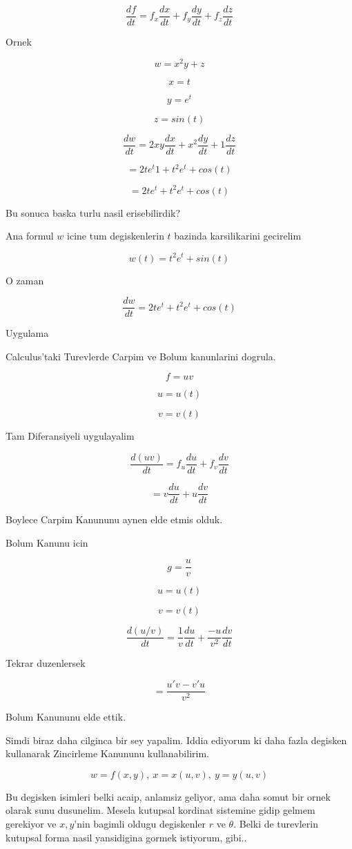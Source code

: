 \documentclass[12pt,fleqn]{article}
\begin{document}
\[ \frac{df}{dt} = f_x\frac{dx}{dt} + f_y\frac{dy}{dt} + f_z\frac{dz}{dt} \]

Ornek

\[ w = x^2y + z \]

\[ x = t \]

\[ y = e^t \]

\[ z = sin(t) \]

\[ \frac{dw}{dt} = 2xy \frac{dx}{dt} + x^2 \frac{dy}{dt} + 1 \frac{dz}{dt}\]

\[ = 2te^t 1 + t^2e^t+cos(t) \]

\[ = 2te^t + t^2e^t+cos(t) \]

Bu sonuca baska turlu nasil erisebilirdik? 

Ana formul $w$ icine tum degiskenlerin $t$ bazinda karsilikarini gecirelim

\[ w(t) = t^2e^t + sin(t) \]

O zaman

\[ \frac{dw}{dt} = 2te^t + t^2e^t + cos(t) \]

Uygulama

Calculus'taki Turevlerde Carpim ve Bolum kanunlarini dogrula. 

\[ f = uv \]

\[ u=u(t) \]

\[ v=v(t) \]

Tam Diferansiyeli uygulayalim

\[ \frac{d(uv)}{dt} = f_u\frac{du}{dt} + f_v \frac{dv}{dt}\]

\[  = v\frac{du}{dt} + u \frac{dv}{dt}\]

Boylece Carpim Kanununu aynen elde etmis olduk. 

Bolum Kanunu icin

\[ g = \frac{u}{v} \]

\[ u=u(t) \]

\[ v=v(t) \]

\[ \frac{d(u/v)}{dt} = \frac{1}{v} \frac{du}{dt} + \frac{-u}{v^2}\frac{dv}{dt}\]

Tekrar duzenlersek

\[ = \frac{u'v - v'u}{v^2} \]

Bolum Kanununu elde ettik.

Simdi biraz daha cilginca bir sey yapalim. Iddia ediyorum ki daha fazla
degisken kullanarak Zincirleme Kanununu kullanabilirim. 

\[ w = f(x,y), \ x = x(u,v), \ y = y(u,v) \]

Bu degisken isimleri belki acaip, anlamsiz geliyor, ama daha somut bir
ornek olarak sunu dusunelim. Mesela kutupsal kordinat sistemine gidip
gelmem gerekiyor ve $x,y$'nin bagimli oldugu degiskenler $r$ ve
$\theta$. Belki de turevlerin kutupsal forma nasil yansidigina gormek
istiyorum, gibi..
\end{document}
